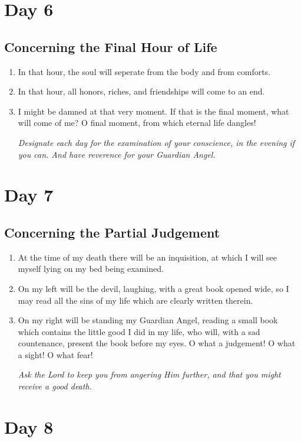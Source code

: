 \documentclass[11pt]{article}
\begin{document}
\section*{Day 6}
\label{sec:org4e089fb}
\subsection*{Concerning the Final Hour of Life}
\label{sec:org881dc58}
\begin{enumerate}
\item In that hour, the soul will seperate from the body and from comforts.
\item In that hour, all honors, riches, and friendships will come to an end.
\item I might be damned at that very moment. If that is the final moment, what will come of me?
O final moment, from which eternal life dangles!

\emph{Designate each day for the examination of your conscience, in the evening if you can. And have reverence for your Guardian Angel.}
\end{enumerate}
\section*{Day 7}
\label{sec:org671730e}
\subsection*{Concerning the Partial Judgement}
\label{sec:orgca77307}
\begin{enumerate}
\item At the time of my death there will be an inquisition, at which I will see myself lying on my bed being examined.
\item On my left will be the devil, laughing, with a great book opened wide, so I may read all the sins of my life which are clearly written therein.
\item On my right will be standing my Guardian Angel, reading a small book which contains the little good I did in my life, who will, with a sad countenance, present the book before my eyes.
O what a judgement! O what a sight! O what fear!

\emph{Ask the Lord to keep you from angering Him further, and that you might receive a good death.}
\end{enumerate}
\section*{Day 8}
\label{sec:orgc0eccc8}
\end{document}
